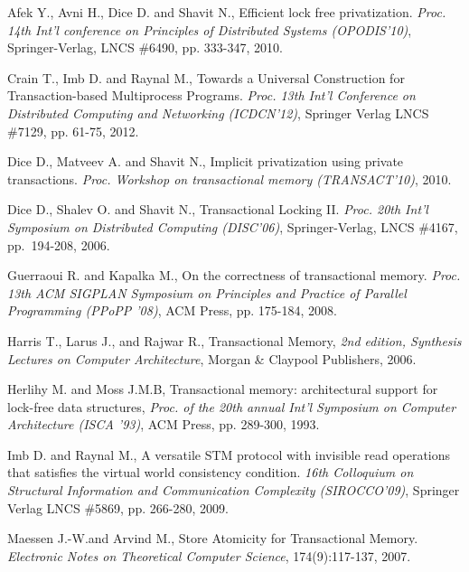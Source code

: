 \documentclass[11pt,letterpaper]{article}
\begin{document}
{\small 

\begin{thebibliography}{guerraoui08}


 Afek Y.,  Avni H.,   Dice D. and  Shavit N.,
Efficient lock free privatization. 
{\it Proc.  14th Int'l conference on Principles of Distributed Systems 
(OPODIS'10)}, Springer-Verlag,  LNCS \#6490, pp. 333-347, 2010. 



Crain T., Imb D. and Raynal M., 
Towards a Universal Construction for Transaction-based Multiprocess Programs.
{\it Proc. 13th Int'l Conference on Distributed Computing and Networking
(ICDCN'12)}, 
Springer Verlag LNCS \#7129, pp. 61-75, 2012. 



Dice D., Matveev A. and  Shavit N.,
 Implicit privatization using private transactions. 
{\it Proc. Workshop on transactional memory (TRANSACT'10)}, 2010.




Dice D., Shalev O. and Shavit N.,
Transactional Locking II.
{\em Proc. 20th Int'l Symposium on Distributed Computing (DISC'06)},
Springer-Verlag, LNCS \#4167, pp.~194-208, 2006.


Guerraoui R. and  Kapalka M.,  
 On the correctness of transactional memory. 
{\it  Proc. 13th ACM SIGPLAN Symposium on Principles and Practice of 
Parallel Programming (PPoPP '08)},  ACM Press, pp.  175-184, 2008.




 Harris T.,  Larus J., and  Rajwar R., 
Transactional Memory, 
{\it 2nd edition, Synthesis Lectures on Computer Architecture},
Morgan \& Claypool Publishers,  2006.




Herlihy M.  and Moss J.M.B,
 Transactional memory: architectural support for lock-free data structures, 
{\it Proc.  of the 20th annual Int'l Symposium on Computer Architecture 
(ISCA '93)}, ACM Press, pp. 289-300, 1993. 



Imb D. and Raynal M., 
A versatile   STM protocol with invisible read operations 
that satisfies  the  virtual world consistency condition.
{\it   16th  Colloquium   on  Structural   Information   and  Communication
Complexity  (SIROCCO'09)}, 
Springer Verlag LNCS   \#5869, pp. 266-280,  2009.


 Maessen J.-W.and Arvind M.,
 Store Atomicity for Transactional Memory. 
{\it Electronic  Notes  on Theoretical  Computer Science}, 
174(9):117-137, 2007.



\end{thebibliography}}
\end{document}
